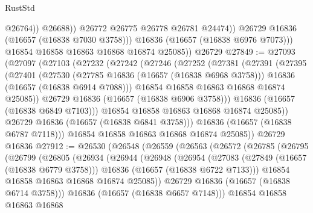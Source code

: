 \begin{lexlean}{RustStd}
\begin{coremodule}
                        @26764))
                    @26688))
                @26772
                @26775
                @26778
                @26781
                @24474))
            @26729
            @16836
            (@16657 (@16838 @7030 @3758)))
          @16836
          (@16657 (@16838 @6976 @7073)))
        @16854
        @16858
        @16863
        @16868
        @16874
        @25085))
    @26729
@27849 := @27093
    (@27097
      (@27103
        (@27232
          (@27242
            (@27246
              (@27252
                (@27381
                  (@27391
                    (@27395
                      (@27401
                        (@27530
                          (@27785 @16836 (@16657 (@16838 @6968 @3758)))
                          @16836
                          (@16657 (@16838 @6914 @7088)))
                        @16854
                        @16858
                        @16863
                        @16868
                        @16874
                        @25085))
                    @26729
                    @16836
                    (@16657 (@16838 @6906 @3758)))
                  @16836
                  (@16657 (@16838 @6849 @7103)))
                @16854
                @16858
                @16863
                @16868
                @16874
                @25085))
            @26729
            @16836
            (@16657 (@16838 @6841 @3758)))
          @16836
          (@16657 (@16838 @6787 @7118)))
        @16854
        @16858
        @16863
        @16868
        @16874
        @25085))
    @26729
    @16836
@27912 := @26530
    (@26548
      (@26559
        (@26563
          (@26572
            (@26785
              (@26795
                (@26799
                  (@26805
                    (@26934
                      (@26944
                        (@26948
                          (@26954
                            (@27083
                              (@27849 (@16657 (@16838 @6779 @3758)))
                              @16836
                              (@16657 (@16838 @6722 @7133)))
                            @16854
                            @16858
                            @16863
                            @16868
                            @16874
                            @25085))
                        @26729
                        @16836
                        (@16657 (@16838 @6714 @3758)))
                      @16836
                      (@16657 (@16838 @6657 @7148)))
                    @16854
                    @16858
                    @16863
                    @16868

\end{coremodule}
\end{lexlean}
